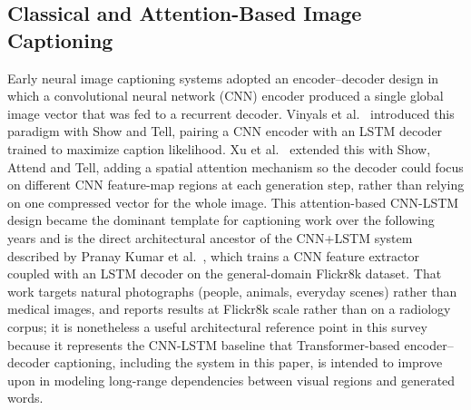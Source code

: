 \documentclass[conference]{IEEEtran}
\begin{document}
\subsection{Classical and Attention-Based Image Captioning}
Early neural image captioning systems adopted an encoder--decoder design in which a convolutional neural network (CNN) encoder produced a single global image vector that was fed to a recurrent decoder. Vinyals et al.~\cite{vinyals2015show} introduced this paradigm with Show and Tell, pairing a CNN encoder with an LSTM decoder trained to maximize caption likelihood. Xu et al.~\cite{xu2015show} extended this with Show, Attend and Tell, adding a spatial attention mechanism so the decoder could focus on different CNN feature-map regions at each generation step, rather than relying on one compressed vector for the whole image. This attention-based CNN-LSTM design became the dominant template for captioning work over the following years and is the direct architectural ancestor of the CNN+LSTM system described by Pranay Kumar et al.~\cite{ijraset2022}, which trains a CNN feature extractor coupled with an LSTM decoder on the general-domain Flickr8k dataset. That work targets natural photographs (people, animals, everyday scenes) rather than medical images, and reports results at Flickr8k scale rather than on a radiology corpus; it is nonetheless a useful architectural reference point in this survey because it represents the CNN-LSTM baseline that Transformer-based encoder--decoder captioning, including the system in this paper, is intended to improve upon in modeling long-range dependencies between visual regions and generated words.
\end{document}

